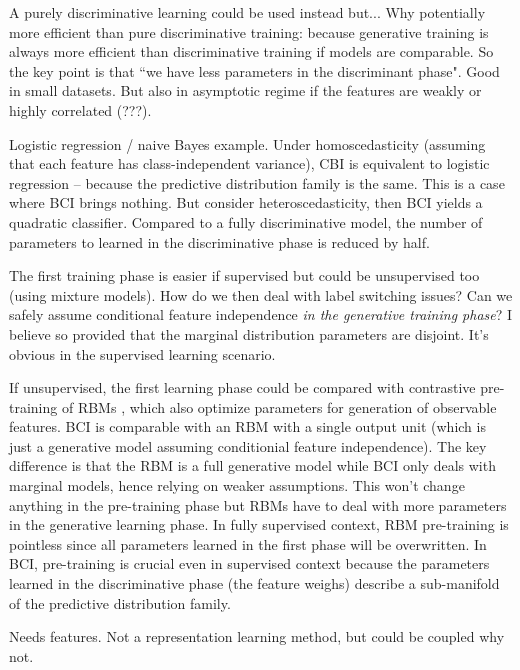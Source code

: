 \documentclass[english]{scrartcl}
\begin{document}

A purely discriminative learning could be used instead but...
Why potentially more efficient than pure discriminative training: because generative training is always more efficient than discriminative training if models are comparable. So the key point is that ``we have less parameters in the discriminant phase". Good in small datasets. But also in asymptotic regime if the features are weakly or highly correlated (???).

Logistic regression / naive Bayes example. Under homoscedasticity (assuming that each feature has class-independent variance), CBI is equivalent to logistic regression -- because the predictive distribution family is the same. This is a case where BCI brings nothing. But consider heteroscedasticity, then BCI yields a quadratic classifier. Compared to a fully discriminative model, the number of parameters to learned in the discriminative phase is reduced by half.

The first training phase is easier if supervised but could be unsupervised too (using mixture models). How do we then deal with label switching issues? Can we safely assume conditional feature independence {\em in the generative training phase}? I believe so provided that the marginal distribution parameters are disjoint. It's obvious in the supervised learning scenario.

If unsupervised, the first learning phase could be compared with contrastive pre-training of RBMs \cite{Hinton-06,Fischer-14}, which also optimize parameters for generation of observable features. BCI is comparable with an RBM with a single output unit (which is just a generative model assuming conditionial feature independence). The key difference is that the RBM is a full generative model while BCI only deals with marginal models, hence relying on weaker assumptions. This won't change anything in the pre-training phase but RBMs have to deal with more parameters in the generative learning phase. In fully supervised context, RBM pre-training is pointless since all parameters learned in the first phase will be overwritten. In BCI, pre-training is crucial even in supervised context because the parameters learned in the discriminative phase (the feature weighs) describe a sub-manifold of the predictive distribution family.

Needs features. Not a representation learning method, but could be coupled why not.
\end{document}
